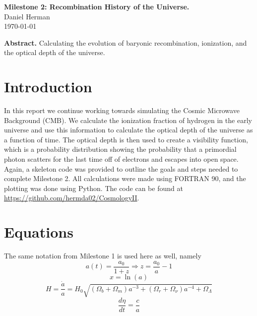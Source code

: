 \documentclass[twoside]{article}
\begin{document}
\begin{center}
  {\Large \bf Milestone 2: Recombination History of the Universe.}\\[4ex]
  {\large Daniel Herman}\\[4ex]
  \normalsize
  \today
  \vspace*{2ex}
      
  \begin{minipage}[t]{12cm}
      
  {\bf Abstract.} Calculating the evolution of baryonic recombination, ionization, and the optical depth of the universe.
	
  \vspace*{2ex}
  \end{minipage}

\end{center}

\section{Introduction}\label{sec:intro}

In this report we continue working towards simulating the Cosmic Microwave Background (CMB). We calculate the ionization fraction of hydrogen in the early universe and use this information to calculate the optical depth of the universe as a function of time. The optical depth is then used to create a visibility function, which is a probability distribution showing the probability that a primordial photon scatters for the last time off of electrons and escapes into open space.\\

Again, a skeleton code was provided to outline the goals and steps needed to complete Milestone 2. All calculations were made using FORTRAN 90, and the plotting was done using Python. The code can be found at \url{https://github.com/hermda02/CosmologyII}.

\section{Equations}\label{sec:eq}

The same notation from Milestone 1 is used here as well, namely
\begin{equation}
a(t) = \dfrac{a_0}{1+z} \Rightarrow z = \dfrac{a_0}{a} -1
\end{equation}
\begin{equation}
x = \ln(a)
\end{equation}
\begin{equation}
H = \dfrac{\dot{a}}{a} = H_0\sqrt{(\Omega_b + \Omega_m)a^{-3} + (\Omega_r + \Omega_{\nu})a^{-4} + \Omega_{\Lambda}}
\end{equation}
\begin{equation}
\dfrac{d\eta}{dt} = \dfrac{c}{a}
\end{equation}
\end{document}
